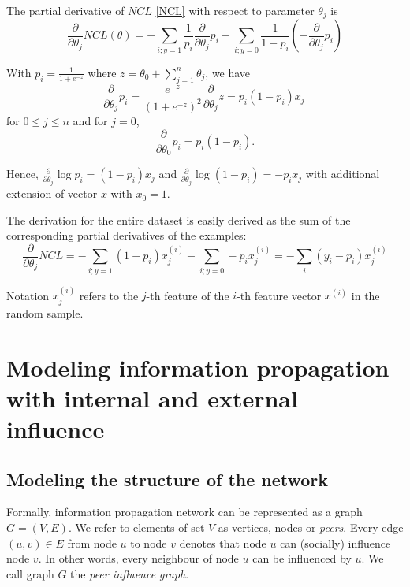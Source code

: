 \documentclass[times, utf8, zavrsni]{fer}
\begin{document}
The partial derivative of $NCL$ \eqref{NCL}  with respect to parameter $\theta_j$ is    
\begin{equation*}
\frac{\partial}{\partial \theta_j} NCL(\theta) = -\sum_{i;y = 1} \frac{1}{p_i} \frac{\partial}{\partial \theta_j} p_i - \sum_{i;y = 0} \frac{1}{1 - p_i} (-\frac{\partial}{\partial \theta_j} p_i)
\end{equation*}

With $p_i = \frac{1}{1 + e^{-z}}$ where $z = \theta_0 + \sum_{j=1}^{n} \theta_j$, we have
\begin{equation}
\frac{\partial}{\partial \theta_j} p_i = \frac{e^{-z}}{(1 + e^{-z})^2} \frac{\partial}{\partial \theta_j} z = p_i (1 - p_i) x_j \
\label{logp1}
\end{equation}
for $0 \le j \leq n$ and for $j = 0$,
\begin{equation*}
\frac{\partial}{\partial \theta_0} p_i = p_i (1 - p_i).
\label{logp2}
\end{equation*}

Hence, $\frac{\partial}{\partial \theta_j} \log p_i = (1 - p_i) x_j$ and $\frac{\partial}{\partial \theta_j} \log (1 - p_i) = - p_i x_j$ with additional extension of vector $x$ with $x_0 = 1$.

The derivation for the entire dataset is easily derived as the sum of the corresponding partial derivatives of the examples:  
\begin{equation}
    \frac{\partial}{\partial \theta_j} NCL = -\sum_{i;y = 1} (1 - p_i)x^{(i)}_j - \sum_{i;y = 0} -p_i x^{(i)}_j = -\sum_{i}(y_i - p_i)x^{(i)}_j
\end{equation}

Notation $x^{(i)}_j$ refers to the $j$-th feature of the $i$-th feature vector $x^{(i)}$ in the random sample.


\chapter{Modeling information propagation with internal and external influence}
\section{Modeling the structure of the network}

Formally, information propagation network can be represented as a graph $G=(V,E)$. We refer to elements of set $V$ as vertices, nodes or \emph{peers}. Every edge $(u, v) \in E$ from node $u$ to node $v$ denotes that node $u$ can (socially) influence node $v$. In other words, every neighbour of node $u$ can be influenced by $u$. We call graph $G$ the \emph{peer influence graph}. 
\end{document}
